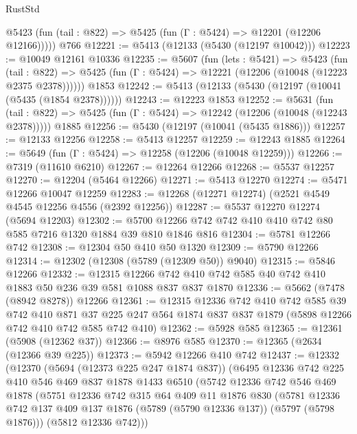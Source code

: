 \begin{lexlean}{RustStd}
\begin{coremodule}
      @5423 (fun (tail : @822) => @5425 (fun (Γ : @5424) => @12201 (@12206 @12166)))))
    @766
@12221 := @5413 (@12133 (@5430 (@12197 @10042)))
@12223 := @10049 @12161 @10336
@12235 := @5607
    (fun (lets : @5421) =>
    @5423
      (fun (tail : @822) =>
      @5425 (fun (Γ : @5424) => @12221 (@12206 (@10048 (@12223 @2375 @2378))))))
    @1853
@12242 := @5413 (@12133 (@5430 (@12197 (@10041 (@5435 (@1854 @2378))))))
@12243 := @12223 @1853
@12252 := @5631
    (fun (tail : @822) => @5425 (fun (Γ : @5424) => @12242 (@12206 (@10048 (@12243 @2378)))))
    @1885
@12256 := @5430 (@12197 (@10041 (@5435 @1886)))
@12257 := @12133 @12256
@12258 := @5413 @12257
@12259 := @12243 @1885
@12264 := @5649 (fun (Γ : @5424) => @12258 (@12206 (@10048 @12259)))
@12266 := @7319 (@11610 @6210)
@12267 := @12264 @12266
@12268 := @5537 @12257
@12270 := @12204 (@5464 @12266)
@12271 := @5413 @12270
@12274 := @5471 @12266 @10047 @12259
@12283 := @12268 (@12271 @12274) (@2521 @4549 @4545 @12256 @4556 (@2392 @12256))
@12287 := @5537 @12270 @12274 (@5694 @12203)
@12302 := @5700 @12266 @742 @742 @410 @410 @742 @80 @585 @7216 @1320 @1884 @39 @810 @1846 @816
@12304 := @5781 @12266 @742
@12308 := @12304 @50 @410 @50 @1320
@12309 := @5790 @12266
@12314 := @12302 (@12308 (@5789 (@12309 @50)) @9040)
@12315 := @5846 @12266
@12332 := @12315
    @12266
    @742
    @410
    @742
    @585
    @40
    @742
    @410
    @1883
    @50
    @236
    @39
    @581
    @1088
    @837
    @837
    @1870
@12336 := @5662 (@7478 (@8942 @8278)) @12266
@12361 := @12315
    @12336
    @742
    @410
    @742
    @585
    @39
    @742
    @410
    @871
    @37
    @225
    @247
    @564
    @1874
    @837
    @837
    @1879
    (@5898 @12266 @742 @410 @742 @585 @742 @410)
@12362 := @5928 @585
@12365 := @12361 (@5908 (@12362 @37))
@12366 := @8976 @585
@12370 := @12365 (@2634 (@12366 @39 @225))
@12373 := @5942 @12266 @410 @742
@12437 := @12332
    (@12370
      (@5694 (@12373 @225 @247 @1874 @837))
      (@6495
        @12336
        @742
        @225
        @410
        @546
        @469
        @837
        @1878
        @1433
        @6510
        (@5742
          @12336
          @742
          @546
          @469
          @1878
          (@5751
            @12336
            @742
            @315
            @64
            @409
            @11
            @1876
            @830
            (@5781
              @12336
              @742
              @137
              @409
              @137
              @1876
              (@5789 (@5790 @12336 @137))
              (@5797 (@5798 @1876)))
            (@5812 @12336 @742)))

\end{coremodule}
\end{lexlean}

